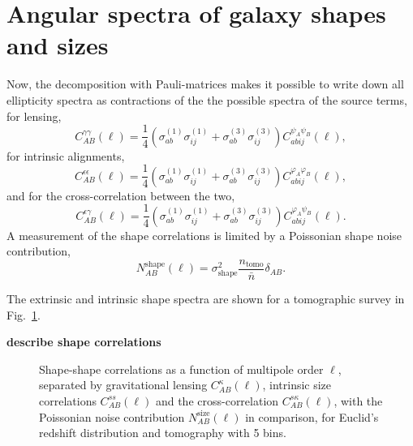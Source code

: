 \documentclass[a4paper,fleqn,usenatbib]{mnras}
\def\spirou#1{{\bf #1}}
\begin{document}
\section{Angular spectra of galaxy shapes and sizes}\label{sect_spectra}
Now, the decomposition with Pauli-matrices makes it possible to write down all ellipticity spectra as contractions of the the possible spectra of the source terms, for lensing,
\begin{equation}
C^{\gamma\gamma}_{AB}(\ell) = \frac{1}{4}
\left(\sigma^{(1)}_{ab}\sigma^{(1)}_{ij} + \sigma^{(3)}_{ab}\sigma^{(3)}_{ij}\right)
C^{\psi_A\psi_B}_{abij}(\ell),
\end{equation}
for intrinsic alignments,
\begin{equation}
C^{\epsilon\epsilon}_{AB}(\ell) = \frac{1}{4}
\left(\sigma^{(1)}_{ab}\sigma^{(1)}_{ij} + \sigma^{(3)}_{ab}\sigma^{(3)}_{ij}\right)
C^{\varphi_A\varphi_B}_{abij}(\ell),
\end{equation}
and for the cross-correlation between the two,
\begin{equation}
C^{\epsilon\gamma}_{AB}(\ell) = \frac{1}{4}
\left(\sigma^{(1)}_{ab}\sigma^{(1)}_{ij} + \sigma^{(3)}_{ab}\sigma^{(3)}_{ij}\right)
C^{\varphi_A\psi_B}_{abij}(\ell).
\end{equation}
A measurement of the shape correlations is limited by a Poissonian shape noise contribution,
\begin{equation}
N_{AB}^\mathrm{shape}(\ell) = \sigma^2_\mathrm{shape}\frac{n_\mathrm{tomo}}{\bar{n}}\delta_{AB}.
\end{equation}


The extrinsic and intrinsic shape spectra are shown for a tomographic survey in Fig.~\ref{fig:shapeshape}.

\spirou{describe shape correlations}


\begin{figure}
\centering
\caption{Shape-shape correlations as a function of multipole order $\ell$, separated by gravitational lensing $C_{AB}^{\kappa}(\ell)$, intrinsic size correlations $C_{AB}^{ss}(\ell)$ and the cross-correlation $C_{AB}^{s\kappa}(\ell)$, with the Poissonian noise contribution $N_{AB}^\mathrm{size}(\ell)$ in comparison, for Euclid's redshift distribution and tomography with 5 bins.}
\label{fig:shapeshape}
\end{figure}
\end{document}
